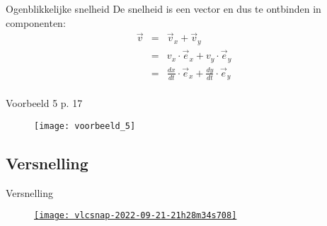 \begin{frame}{Ogenblikkelijke snelheid}
De snelheid is een vector en dus te ontbinden in componenten:
\begin{eqnarray*}	
\vec{v}&=&\vec{v}_x+ \vec{v}_y\\
&=&v_x\cdot\vec{e}_x+v_y\cdot\vec{e}_y\\
&=&\frac{dx}{dt}\cdot\vec{e}_x+\frac{dy}{dt}\cdot\vec{e}_y\\
\end{eqnarray*}
\end{frame}



\begin{frame}{Voorbeeld 5 p. 17}
\begin{figure}
\texttt{[image: voorbeeld\_5]}
\end{figure}
\end{frame}





\subsection{Versnelling}


\begin{frame}{Versnelling}
\begin{figure}
\href{run:./media/ProjectilefromaMovingTruckDemo.webm}{%
\texttt{[image: vlcsnap-2022-09-21-21h28m34s708]}
}
\end{figure}
\end{frame}

